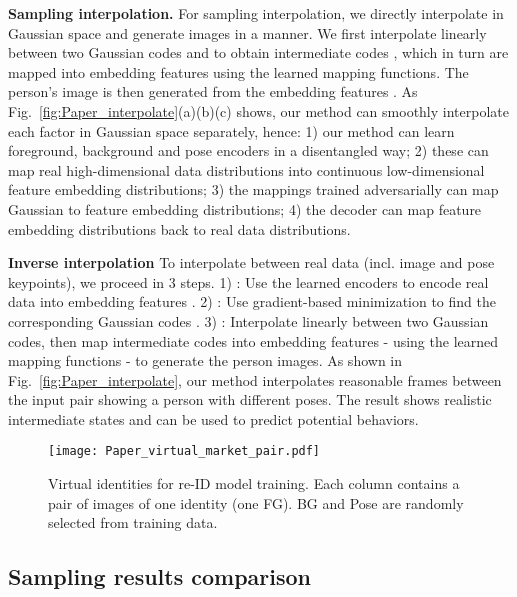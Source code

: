 \documentclass[10pt,twocolumn,letterpaper]{article}
\newcommand{\myparagraph}[1]{\vspace{0.0em}\noindent\textbf{#1}}
\begin{document}
\myparagraph{Sampling interpolation.}
For sampling interpolation, we directly interpolate in Gaussian space and generate images in a  manner. 
We first interpolate linearly between two Gaussian codes  and  to obtain intermediate codes , which in turn are mapped into embedding features  using the learned mapping functions. 
The person's image is then generated from the embedding features .
As Fig.~\ref{fig:Paper_interpolate}(a)(b)(c) shows, our method can smoothly interpolate each factor in Gaussian space separately, hence: 
1) our method can learn foreground, background and pose encoders in a disentangled way; 
2) these can map real high-dimensional data distributions into continuous low-dimensional feature embedding distributions; 
3) the mappings trained adversarially can map Gaussian to feature embedding distributions; 
4) the decoder can map feature embedding distributions back to real data distributions.

\myparagraph{Inverse interpolation}
To interpolate between real data (incl. image and pose keypoints), we proceed in 3 steps. 
1) : Use the learned encoders to encode real data  into embedding features . 
2) : Use gradient-based minimization \cite{inverse} to find the corresponding Gaussian codes . 
3) : Interpolate linearly between two Gaussian codes, then map intermediate codes into embedding features - using the learned mapping functions - to generate the person images.
As shown in Fig.~\ref{fig:Paper_interpolate}, our method interpolates reasonable frames between the input pair showing a person with different poses. 
The result shows realistic intermediate states and can be used to predict potential behaviors. 


\begin{figure}[htp]
  \centering
  \texttt{[image: Paper\_virtual\_market\_pair.pdf]}\\
\vspace{-1mm}
  \caption{Virtual identities for re-ID model training. Each column contains a pair of images of one identity (one FG). BG and Pose are randomly selected from training data.}
\label{fig:Paper_virtual_market}
\end{figure}

\subsection{Sampling results comparison}
\vspace{-0.5mm}
\label{sec:sampling_comparison}
\end{document}
